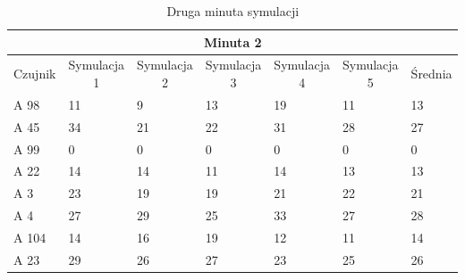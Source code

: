\documentclass[a4paper,12pt]{article}
\begin{document}
\begin{table}[!h]
	\centering

\begin{tabular}{|l|l|l|l|l|l|l|}
\hline
\multicolumn{7}{|c|}{Minuta 2}                                                                                                                                                                                                                   \\ \hline
\multicolumn{1}{|c|}{Czujnik} & \multicolumn{1}{c|}{Symulacja 1} & \multicolumn{1}{c|}{Symulacja 2} & \multicolumn{1}{c|}{Symulacja 3} & \multicolumn{1}{c|}{Symulacja 4} & \multicolumn{1}{c|}{Symulacja 5} & \multicolumn{1}{c|}{Średnia} \\ \hline
A 98                          & 11                               & 9                                & 13                              & 19                             & 11                             & 13                                     \\ \hline
A 45                          & 34                               & 21                               & 22                              & 31                             & 28                             & 27                                     \\ \hline
A 99                          & 0                                & 0                                & 0                               & 0                              & 0                              & 0                                      \\ \hline
A 22                          & 14                               & 14                               & 11                              & 14                             & 13                             & 13                                     \\ \hline
A 3                           & 23                               & 19                               & 19                              & 21                             & 22                             & 21                                     \\ \hline
A 4                           & 27                               & 29                               & 25                              & 33                             & 27                             & 28                                     \\ \hline
A 104                         & 14                               & 16                               & 19                              & 12                             & 11                             & 14                                     \\ \hline
A 23                          & 29                               & 26                               & 27                              & 23                             & 25                             & 26                                     \\ \hline
\end{tabular}
\caption{Druga minuta symulacji}
\label{tab:2}
\end{table}
\end{document}
